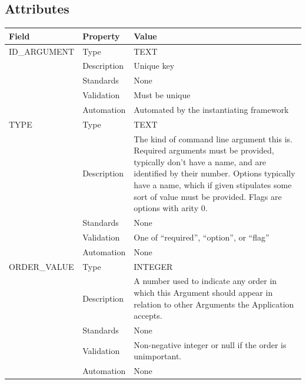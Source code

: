 \subsection{Attributes}\label{attributes-3}

\begin{longtable}[]{@{}
  >{\raggedright\arraybackslash}p{}
  >{\raggedright\arraybackslash}p{}
  >{\raggedright\arraybackslash}p{}@{}}
\toprule\noalign{}
\begin{minipage}[b]{\linewidth}\raggedright
Field
\end{minipage} & \begin{minipage}[b]{\linewidth}\raggedright
Property
\end{minipage} & \begin{minipage}[b]{\linewidth}\raggedright
Value
\end{minipage} \\
\midrule\noalign{}
\endhead
\bottomrule\noalign{}
\endlastfoot
ID\_ARGUMENT & Type & TEXT \\
& Description & Unique key \\
& Standards & None \\
& Validation & Must be unique \\
& Automation & Automated by the instantiating framework \\
TYPE & Type & TEXT \\
& Description & The kind of command line argument this is. Required
arguments must be provided, typically don't have a name, and are
identified by their number. Options typically have a name, which if
given stipulates some sort of value must be provided. Flags are options
with arity 0. \\
& Standards & None \\
& Validation & One of ``required'', ``option'', or ``flag'' \\
& Automation & None \\
ORDER\_VALUE & Type & INTEGER \\
& Description & A number used to indicate any order in which this
Argument should appear in relation to other Arguments the Application
accepts. \\
& Standards & None \\
& Validation & Non-negative integer or null if the order is
unimportant. \\
& Automation & None \\

\end{longtable}
